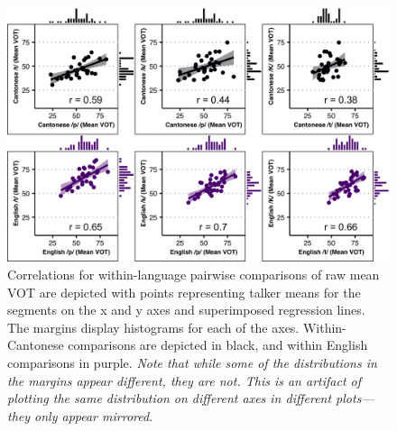\begin{figure}[htbp]
  \begin{center}
  \includegraphics[width=0.9\linewidth]{figures/ch4_correlations1_5in.png} 
  \caption{Correlations for within-language pairwise comparisons of raw mean VOT are depicted with points representing talker means for the segments on the x and y axes and superimposed regression lines. The margins display histograms for each of the axes. Within-Cantonese comparisons are depicted in black, and within English comparisons in purple. \textit{Note that while some of the distributions in the margins appear different, they are not. This is an artifact of plotting the same distribution on different axes in different plots---they only appear mirrored.}}
  \label{ch4:fig:correlations1}
  \end{center}
\end{figure}

